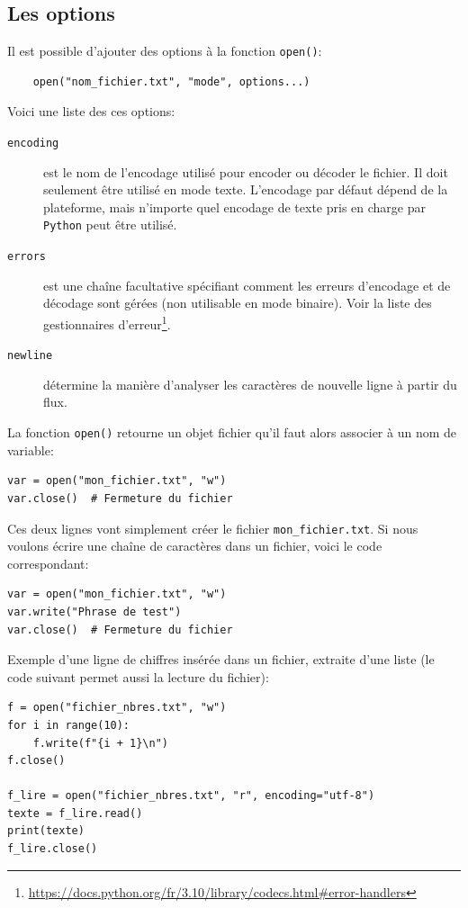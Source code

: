 \documentclass[a4paper,11pt]{book}
\begin{document}
\subsection*{Les options}
Il est possible d'ajouter des options à la fonction \texttt{open()}:
\begin{verbatim}
    open("nom_fichier.txt", "mode", options...)
\end{verbatim}
\medskip

Voici une liste des ces options:
\begin{description}
    \item[\texttt{encoding}] est le nom de l'encodage utilisé pour encoder ou décoder le fichier. Il doit seulement être utilisé en mode texte. L'encodage par défaut dépend de la plateforme, mais n'importe quel encodage de texte pris en charge par \texttt{Python} peut être utilisé.
    \item[\texttt{errors}] est une chaîne facultative spécifiant comment les erreurs d'encodage et de décodage sont gérées (non utilisable en mode binaire). Voir la liste des gestionnaires d'erreur\footnote{\url{https://docs.python.org/fr/3.10/library/codecs.html\#error-handlers}}.
    \item[\texttt{newline}] détermine la manière d'analyser les caractères de nouvelle ligne à partir du flux.
\end{description}
\medskip

La fonction \texttt{open()} retourne un objet fichier qu'il faut alors associer à un nom de variable:
\begin{lstlisting}
var = open("mon_fichier.txt", "w")
var.close()  # Fermeture du fichier
\end{lstlisting}
\medskip

Ces deux lignes vont simplement créer le fichier \texttt{mon\_fichier.txt}. Si nous voulons écrire une chaîne de caractères dans un fichier, voici le code correspondant:
 \begin{lstlisting}
var = open("mon_fichier.txt", "w")
var.write("Phrase de test")
var.close()  # Fermeture du fichier
\end{lstlisting}
\medskip

Exemple d'une ligne de chiffres insérée dans un fichier, extraite d'une liste (le code suivant permet aussi la lecture du fichier):
\begin{lstlisting}
f = open("fichier_nbres.txt", "w")
for i in range(10):
    f.write(f"{i + 1}\n")
f.close()

f_lire = open("fichier_nbres.txt", "r", encoding="utf-8")
texte = f_lire.read()
print(texte)
f_lire.close()
\end{lstlisting}
\medskip
\end{document}
